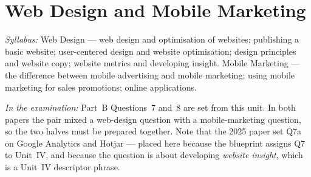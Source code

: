 \chapter{Web Design and Mobile Marketing}

\textit{Syllabus:} Web Design --- web design and optimisation of websites;
publishing a basic website; user-centered design and website optimisation;
design principles and website copy; website metrics and developing insight.
Mobile Marketing --- the difference between mobile advertising and mobile
marketing; using mobile marketing for sales promotions; online applications.

\textit{In the examination:} Part~B Questions~7 and~8 are set from this unit.
In both papers the pair mixed a web-design question with a mobile-marketing
question, so the two halves must be prepared together. Note that the 2025 paper
set Q7a on Google Analytics and Hotjar --- placed here because the blueprint
assigns Q7 to Unit~IV, and because the question is about developing
\emph{website insight}, which is a Unit~IV descriptor phrase.

\parta

